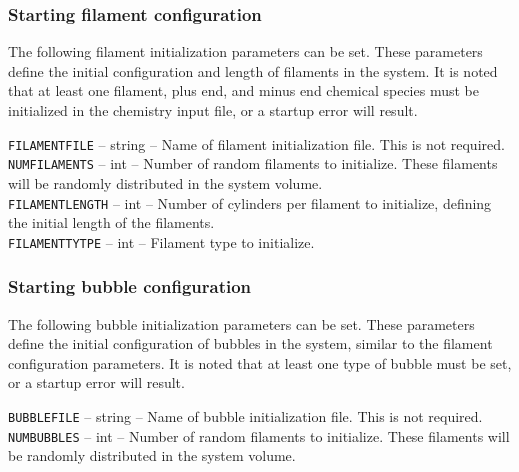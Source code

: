 \documentclass[11pt, oneside]{article}   	%
\begin{document}
 
\normalsize

\subsubsection{Starting filament configuration}

The following filament initialization parameters can be set. These parameters define the initial configuration and length
of filaments in the system. It is noted that at least one filament, plus end, and minus end chemical species must be initialized in the chemistry input file, or a startup error will result.\\

\small

  \noindent\texttt{FILAMENTFILE} -- string -- Name of filament initialization file. This is not required.\\

  \noindent\texttt{NUMFILAMENTS} -- int -- Number of random filaments to initialize. These filaments will be randomly 
  distributed in the system volume.\\

  \noindent\texttt{FILAMENTLENGTH} -- int -- Number of cylinders per filament to initialize, defining the initial length of the filaments.\\
  
   \noindent\texttt{FILAMENTTYTPE} -- int -- Filament type to initialize.\\

\normalsize

\subsubsection{Starting bubble configuration}

The following bubble initialization parameters can be set. These parameters define the initial configuration of bubbles in the system, similar to the filament configuration parameters. It is noted that at least one type of bubble must be set, or a startup error will result.\\

\small

  \noindent\texttt{BUBBLEFILE} -- string -- Name of bubble initialization file. This is not required.\\

  \noindent\texttt{NUMBUBBLES} -- int -- Number of random filaments to initialize. These filaments will be randomly 
  distributed in the system volume.\\
\end{document}
